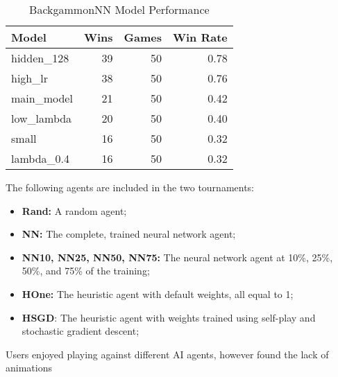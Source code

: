 \begin{table}[ht]
    \centering

    \begin{tabular}{lrrr}
      \toprule
      \textbf{Model}      & \textbf{Wins} & \textbf{Games} & \textbf{Win Rate} \\
      \midrule
      hidden\_128         & 39            & 50             & 0.78            \\
      high\_lr            & 38            & 50             & 0.76            \\
      main\_model         & 21            & 50             & 0.42            \\
      low\_lambda         & 20            & 50             & 0.40            \\
      small               & 16            & 50             & 0.32            \\
      lambda\_0.4         & 16            & 50             & 0.32            \\
      \bottomrule
    \end{tabular}
    \caption{BackgammonNN Model Performance}
    \label{tab:model_performance1}
\end{table}

The following agents are included in the two tournaments:
\begin{itemize}
    \item \textbf{Rand:} A random agent;
    \item \textbf{NN:} The complete, trained neural network agent;
    \item \textbf{NN10, NN25, NN50, NN75:} The neural network agent at 10\%, 25\%, 50\%, and 75\% of the training;
    \item \textbf{HOne:} The heuristic agent with default weights, all equal to 1;
    \item \textbf{HSGD}: The heuristic agent with weights trained using self-play and stochastic gradient descent;
\end{itemize}

Users enjoyed playing against different AI agents, however found the lack of animations 